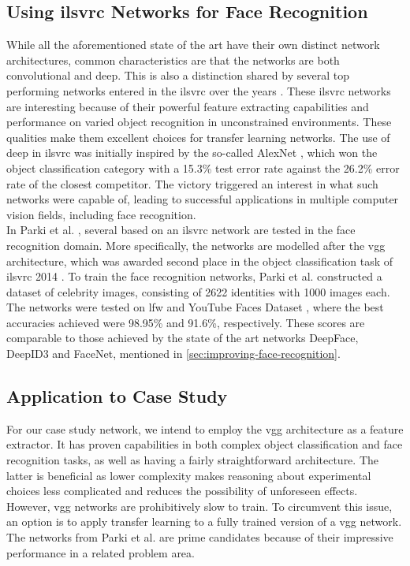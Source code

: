 \subsection{Using \acrshort{ilsvrc} Networks for Face Recognition}

While all the aforementioned state of the art  have their own distinct network architectures, common characteristics are that the networks are both convolutional and deep. This is also a distinction shared by several top performing networks entered in the \acrfull{ilsvrc} \cite{imagenet} over the years \cite{inception, vgg, googlenet}. These \acrshort{ilsvrc} networks are interesting because of their powerful feature extracting capabilities and performance on varied object recognition in unconstrained environments. These qualities make them excellent choices for transfer learning networks. The use of deep  in \acrshort{ilsvrc} was initially inspired by the so-called AlexNet \cite{alexnet}, which won the object classification category with a 15.3\% test error rate against the 26.2\% error rate of the closest competitor. The victory triggered an interest in what such networks were capable of, leading to successful applications in multiple computer vision fields, including face recognition. \\

\noindent In Parki et al. \cite{deep-face-rec}, several  based on an \acrshort{ilsvrc} network are tested in the face recognition domain. More specifically, the networks are modelled after the \acrfull{vgg} architecture, which was awarded second place in the object classification task of \acrshort{ilsvrc} 2014 \cite{vgg}. To train the face recognition networks, Parki et al. \cite{deep-face-rec} constructed a dataset of celebrity images, consisting of 2622 identities with 1000 images each. The networks were tested on \acrshort{lfw} and YouTube Faces Dataset \cite{youtube-set}, where the best accuracies achieved were 98.95\% and 91.6\%, respectively. These scores are comparable to those achieved by the state of the art networks DeepFace, DeepID3 and FaceNet, mentioned in \autoref{sec:improving-face-recognition}.

\subsection{Application to Case Study} \label{sec:vggface-application}

For our case study network, we intend to employ the \acrshort{vgg} architecture as a feature extractor. It has proven capabilities in both complex object classification and face recognition tasks, as well as having a fairly straightforward architecture. The latter is beneficial as lower complexity makes reasoning about experimental choices less complicated and reduces the possibility of unforeseen effects. However, \acrshort{vgg} networks are prohibitively slow to train. To circumvent this issue, an option is to apply transfer learning to a fully trained version of a \acrshort{vgg} network. The networks from Parki et al. \cite{deep-face-rec} are prime candidates because of their impressive performance in a related problem area.

\cleardoublepage